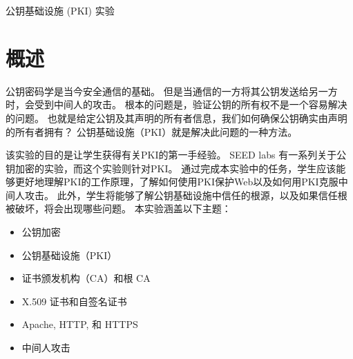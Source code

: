 




\newcommand{\pkiFigs}{./Figs}

\newcommand{\OpenSSL} {\texttt{OpenSSL}\xspace}
\newcommand{\pkiserver}{\texttt{SEEDPKILab2020.com}\xspace}





\begin{center}
{\LARGE 公钥基础设施 (PKI) 实验}
\end{center}




\section{概述}



公钥密码学是当今安全通信的基础。
但是当通信的一方将其公钥发送给另一方时，会受到中间人的攻击。
根本的问题是，验证公钥的所有权不是一个容易解决的问题。
也就是给定公钥及其声明的所有者信息，我们如何确保公钥确实由声明的所有者拥有？
公钥基础设施（PKI）就是解决此问题的一种方法。


该实验的目的是让学生获得有关PKI的第一手经验。
SEED labs 有一系列关于公钥加密的实验，而这个实验则针对PKI。
通过完成本实验中的任务，学生应该能够更好地理解PKI的工作原理，了解如何使用PKI保护Web以及如何用PKI克服中间人攻击。
此外，学生将能够了解公钥基础设施中信任的根源，以及如果信任根被破坏，将会出现哪些问题。
本实验涵盖以下主题：

\begin{itemize}[noitemsep]
\item 公钥加密
\item 公钥基础设施（PKI）
\item 证书颁发机构（CA）和根 CA
\item X.509 证书和自签名证书
\item Apache, HTTP, 和 HTTPS
\item 中间人攻击
\end{itemize}



